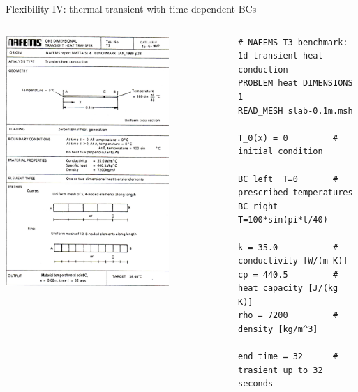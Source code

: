 \documentclass[
  ignorenonframetext,
  aspectratio=169,
]{beamer}
\begin{document}
\begin{frame}[fragile]{Flexibility IV: thermal transient with
time-dependent BCs}
\protect\hypertarget{flexibility-iv-thermal-transient-with-time-dependent-bcs}{}
\begin{columns}[T]
\begin{column}{0.5\textwidth}
\centering \includegraphics[width=0.75\textwidth,height=\textheight]{nafems-t3.png}
\end{column}

\pause

\begin{column}{0.5\textwidth}
\begin{lstlisting}[style=feenox]
# NAFEMS-T3 benchmark: 1d transient heat conduction
PROBLEM heat DIMENSIONS 1
READ_MESH slab-0.1m.msh

T_0(x) = 0         # initial condition

BC left  T=0       # prescribed temperatures
BC right T=100*sin(pi*t/40)

k = 35.0           # conductivity [W/(m K)]
cp = 440.5         # heat capacity [J/(kg K)]
rho = 7200         # density [kg/m^3]

end_time = 32      # trasient up to 32 seconds


\end{lstlisting}
\end{column}
\end{columns}
\end{frame}
\end{document}

